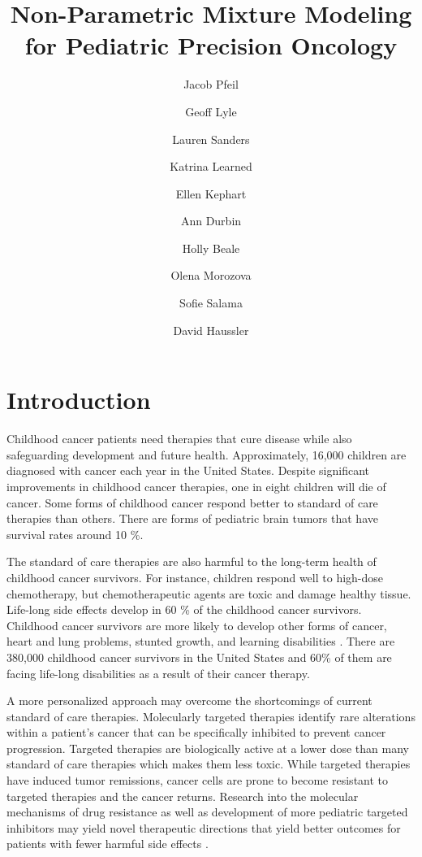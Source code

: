 \documentclass[fleqn,10pt]{wlscirep}
\title{Non-Parametric Mixture Modeling for Pediatric Precision Oncology}
\author[1,*]{Jacob Pfeil}
\author[1]{Geoff Lyle}
\author[1]{Lauren Sanders}
\author[1]{Katrina Learned}
\author[1]{Ellen Kephart}
\author[1]{Ann Durbin}
\author[1]{Holly Beale}
\author[1]{Olena Morozova}
\author[1]{Sofie Salama}
\author[1]{David Haussler}
\affil[1]{University of California, Santa Cruz, Biomolecular Engineering, Santa Cruz, 95064, United States}
\affil[*]{jpfeil@ucsc.edu}
\newcommand{\textapprox}{\raisebox{0.5ex}{\texttildelow}}
\begin{document}
\flushbottom
\maketitle
%
%
\thispagestyle{empty}


\section*{Introduction}


Childhood cancer patients need therapies that cure disease while also safeguarding development and future health. Approximately, 16,000 children are diagnosed with cancer each year in the United States. Despite significant improvements in childhood cancer therapies, one in eight children will die of cancer. Some forms of childhood cancer respond better to standard of care therapies than others. There are forms of pediatric brain tumors that have survival rates around \textapprox 10 \%. 

The standard of care therapies are also harmful to the long-term health of childhood cancer survivors. For instance, children respond well to high-dose chemotherapy, but chemotherapeutic agents are toxic and damage healthy tissue. Life-long side effects develop in \textapprox 60 \% of the childhood cancer survivors. Childhood cancer survivors are more likely to develop other forms of cancer, heart and lung problems, stunted growth, and learning disabilities \cite{cancer.org:longTermEffects,kopp2012late,AmericanCancerSociety:ChildCancer}. There are \textapprox 380,000 childhood cancer survivors in the United States and 60\% of them are facing life-long disabilities as a result of their cancer therapy.

A more personalized approach may overcome the shortcomings of current standard of care therapies. Molecularly targeted therapies identify rare alterations within a patient's cancer that can be specifically inhibited to prevent cancer progression. Targeted therapies are biologically active at a lower dose than many standard of care therapies which makes them less toxic. While targeted therapies have induced tumor remissions, cancer cells are prone to become resistant to targeted therapies and the cancer returns. Research into the molecular mechanisms of drug resistance as well as development of more pediatric targeted inhibitors may yield novel therapeutic directions that yield better outcomes for patients with fewer harmful side effects \cite{norris2012challenges}. 
\end{document}
